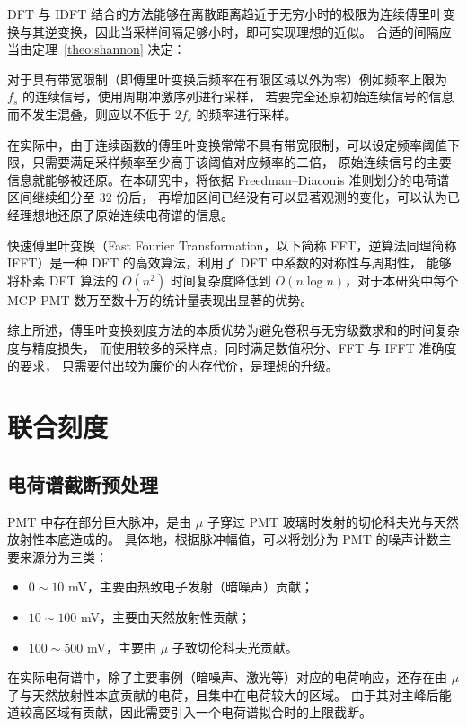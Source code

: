 DFT 与 IDFT 结合的方法能够在离散距离趋近于无穷小时的极限为连续傅里叶变换与其逆变换，因此当采样间隔足够小时，即可实现理想的近似。
合适的间隔应当由定理~\ref{theo:shannon} 决定：
\begin{theorem}\label{theo:shannon}
    对于具有带宽限制（即傅里叶变换后频率在有限区域以外为零）例如频率上限为 $f_s$ 的连续信号，使用周期冲激序列进行采样，
    若要完全还原初始连续信号的信息而不发生混叠，则应以不低于 $2f_s$ 的频率进行采样。
\end{theorem}

在实际中，由于连续函数的傅里叶变换常常不具有带宽限制，可以设定频率阈值下限，只需要满足采样频率至少高于该阈值对应频率的二倍，
原始连续信号的主要信息就能够被还原。在本研究中，将依据 Freedman–Diaconis 准则划分的电荷谱区间继续细分至 32 份后，
再增加区间已经没有可以显著观测的变化，可以认为已经理想地还原了原始连续电荷谱的信息。

快速傅里叶变换（Fast Fourier Transformation，以下简称 FFT，逆算法同理简称 IFFT）是一种 DFT 的高效算法，利用了 DFT 中系数的对称性与周期性，
能够将朴素 DFT 算法的 $O(n^2)$ 时间复杂度降低到 $O(n\log{n})$，对于本研究中每个 MCP-PMT 数万至数十万的统计量表现出显著的优势。

综上所述，傅里叶变换刻度方法的本质优势为避免卷积与无穷级数求和的时间复杂度与精度损失，
而使用较多的采样点，同时满足数值积分、FFT 与 IFFT 准确度的要求，
只需要付出较为廉价的内存代价，是理想的升级。

\section{联合刻度}

\subsection{电荷谱截断预处理}\label{sec:cut}
PMT 中存在部分巨大脉冲，是由 $\mu$ 子穿过 PMT 玻璃时发射的切伦科夫光与天然放射性本底造成的\cite{zhangStudy20inchPMTs2022}。
具体地，根据脉冲幅值，可以将划分为 PMT 的噪声计数主要来源分为三类\cite{zhangDarkCount20inch2024}：
\begin{itemize}
    \item $0\sim10$ mV，主要由热致电子发射（暗噪声）贡献；
    \item $10\sim100$ mV，主要由天然放射性贡献；
    \item $100\sim500$ mV，主要由 $\mu$ 子致切伦科夫光贡献。
\end{itemize}

在实际电荷谱中，除了主要事例（暗噪声、激光等）对应的电荷响应，还存在由 $\mu$ 子与天然放射性本底贡献的电荷，且集中在电荷较大的区域。
由于其对主峰后能道较高区域有贡献，因此需要引入一个电荷谱拟合时的上限截断。

